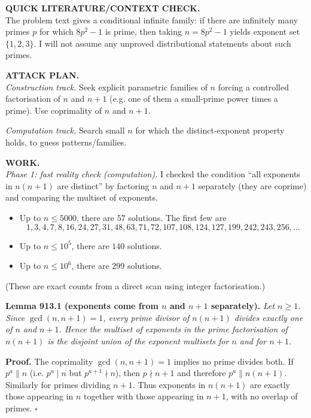 \medskip
\noindent\textbf{QUICK LITERATURE/CONTEXT CHECK.}\\
The problem text gives a conditional infinite family: if there are infinitely many primes $p$ for which $8p^2-1$ is prime, then taking $n=8p^2-1$ yields exponent set $\{1,2,3\}$. I will not assume any unproved distributional statements about such primes.

\medskip
\noindent\textbf{ATTACK PLAN.}\\
\emph{Construction track.} Seek explicit parametric families of $n$ forcing a controlled factorisation of $n$ and $n+1$ (e.g. one of them a small-prime power times a prime). Use coprimality of $n$ and $n+1$.

\smallskip
\noindent\emph{Computation track.} Search small $n$ for which the distinct-exponent property holds, to guess patterns/families.

\medskip
\noindent\textbf{WORK.}\\
\emph{Phase 1: fast reality check (computation).}  I checked the condition ``all exponents in $n(n+1)$ are distinct'' by factoring $n$ and $n+1$ separately (they are coprime) and comparing the multiset of exponents.

\begin{itemize}
\item Up to $n\le 5000$, there are $57$ solutions. The first few are
\[
1,3,4,7,8,16,24,27,31,48,63,71,72,107,108,124,127,199,242,243,256,\dots
\]
\item Up to $n\le 10^5$, there are $140$ solutions.
\item Up to $n\le 10^6$, there are $299$ solutions.
\end{itemize}
(These are exact counts from a direct scan using integer factorisation.)

\medskip
\noindent\textbf{Lemma 913.1 (exponents come from $n$ and $n+1$ separately).}  \emph{Let $n\ge 1$. Since $\gcd(n,n+1)=1$, every prime divisor of $n(n+1)$ divides exactly one of $n$ and $n+1$. Hence the multiset of exponents in the prime factorisation of $n(n+1)$ is the disjoint union of the exponent multisets for $n$ and for $n+1$.}

\noindent\textbf{Proof.} The coprimality $\gcd(n,n+1)=1$ implies no prime divides both. If $p^a\parallel n$ (i.e. $p^a\mid n$ but $p^{a+1}\nmid n$), then $p\nmid n+1$ and therefore $p^a\parallel n(n+1)$. Similarly for primes dividing $n+1$. Thus exponents in $n(n+1)$ are exactly those appearing in $n$ together with those appearing in $n+1$, with no overlap of primes. \hfill$\square$

